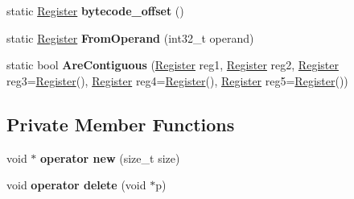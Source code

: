 \begin{DoxyCompactItemize}
\item 
static \hyperlink{classv8_1_1internal_1_1interpreter_1_1_register}{Register} {\bfseries bytecode\+\_\+offset} ()\hypertarget{classv8_1_1internal_1_1interpreter_1_1_register_a44da31aa1958603b97a404455281b4bd}{}\label{classv8_1_1internal_1_1interpreter_1_1_register_a44da31aa1958603b97a404455281b4bd}

\item 
static \hyperlink{classv8_1_1internal_1_1interpreter_1_1_register}{Register} {\bfseries From\+Operand} (int32\+\_\+t operand)\hypertarget{classv8_1_1internal_1_1interpreter_1_1_register_a361dbef239c6ade5668d5d29f6458617}{}\label{classv8_1_1internal_1_1interpreter_1_1_register_a361dbef239c6ade5668d5d29f6458617}

\item 
static bool {\bfseries Are\+Contiguous} (\hyperlink{classv8_1_1internal_1_1interpreter_1_1_register}{Register} reg1, \hyperlink{classv8_1_1internal_1_1interpreter_1_1_register}{Register} reg2, \hyperlink{classv8_1_1internal_1_1interpreter_1_1_register}{Register} reg3=\hyperlink{classv8_1_1internal_1_1interpreter_1_1_register}{Register}(), \hyperlink{classv8_1_1internal_1_1interpreter_1_1_register}{Register} reg4=\hyperlink{classv8_1_1internal_1_1interpreter_1_1_register}{Register}(), \hyperlink{classv8_1_1internal_1_1interpreter_1_1_register}{Register} reg5=\hyperlink{classv8_1_1internal_1_1interpreter_1_1_register}{Register}())\hypertarget{classv8_1_1internal_1_1interpreter_1_1_register_a6b19d105a97a04f4ae37f32d1854d2c7}{}\label{classv8_1_1internal_1_1interpreter_1_1_register_a6b19d105a97a04f4ae37f32d1854d2c7}

\end{DoxyCompactItemize}
\subsection*{Private Member Functions}
\begin{DoxyCompactItemize}
\item 
void $\ast$ {\bfseries operator new} (size\+\_\+t size)\hypertarget{classv8_1_1internal_1_1interpreter_1_1_register_ab909002392b216cc069cf0e9a454f985}{}\label{classv8_1_1internal_1_1interpreter_1_1_register_ab909002392b216cc069cf0e9a454f985}

\item 
void {\bfseries operator delete} (void $\ast$p)\hypertarget{classv8_1_1internal_1_1interpreter_1_1_register_a7b0e9ce99d5f08912b43f30ae55746d2}{}\label{classv8_1_1internal_1_1interpreter_1_1_register_a7b0e9ce99d5f08912b43f30ae55746d2}

\end{DoxyCompactItemize}
